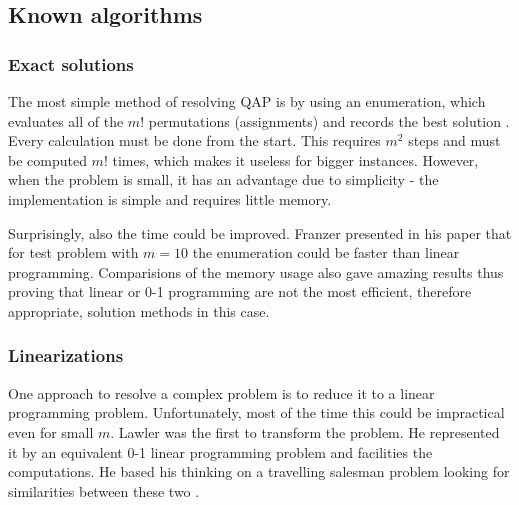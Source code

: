 \documentclass[english,a4paper,twoside]{ppfcmthesis}
\begin{document}
\subsection{Known algorithms}
\subsubsection{Exact solutions}

The most simple method of resolving QAP is by using an enumeration, which evaluates all of the $m!$ permutations (assignments) and records the best solution \cite{frazer1997602}.
Every calculation must be done from the start.
This requires $m^2$ steps and must be computed $m!$ times, which makes it useless for bigger instances.
However, when the problem is small, it has an advantage due to simplicity - the implementation is simple and requires little memory.

Surprisingly, also the time could be improved. Franzer presented in his paper \cite{frazer1997602} that for test problem with $m=10$ the enumeration could be faster than linear programming. Comparisions of the memory usage also gave amazing results thus proving that linear or 0-1 programming are not the most efficient, therefore appropriate, solution methods in this case.

\subsubsection{Linearizations}
One approach to resolve a complex problem is to reduce it to a linear programming problem.
Unfortunately, most of the time this could be impractical even for small $m$. Lawler \cite{lawler1963} was the first to transform the problem. He represented it by an equivalent 0-1 linear programming problem and facilities the computations. He based his thinking on a travelling salesman problem looking for similarities between these two \cite{charnsethikul1988exact}.
\end{document}
